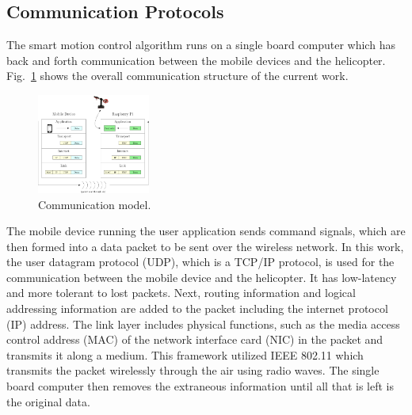 \documentclass[letterpaper, 10pt, conference]{ieeeconf}
\begin{document}
\subsection{Communication Protocols}
The smart motion control algorithm runs on a single board computer which has back and forth communication between the mobile devices and the helicopter.  Fig.~\ref{fig:TCPModel} shows the overall communication structure of the current work. %
\begin{figure}
  \centering
  \includegraphics[width=0.33\textwidth]{figs/ipe/TCPModel}
  \caption{Communication model.}
  \label{fig:TCPModel}
\end{figure}
%
The mobile device running the user application sends command signals, which are then formed into a data packet to be sent over the wireless network. In this work, the user datagram protocol (UDP), which is a TCP/IP protocol, is used for the communication between the mobile device and the helicopter. It has low-latency and more tolerant to lost packets.  Next, routing information and logical addressing information are added to the packet including the internet protocol (IP) address. The link layer includes physical functions,  such as the media access control address (MAC) of the network interface card (NIC) in the packet and transmits it along a medium.  This framework utilized IEEE 802.11 which transmits the packet wirelessly through the air using radio waves.  The single board computer then removes the extraneous information until all that is left is the original data. 
\end{document}
